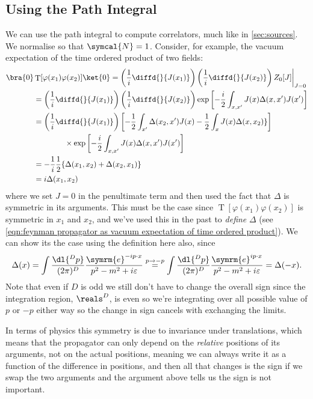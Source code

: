 \documentclass[fleqn]{NotesClass}
\newcommand{\e}{\symrm{e}}
\DeclareMathOperator{\timeOrdering}{T}
\begin{document}
    \subsection{Using the Path Integral}
    We can use the path integral to compute correlators, much like in \cref{sec:sources}.
    We normalise so that \(\symcal{N} = 1\).
    Consider, for example, the vacuum expectation of the time ordered product of two fields:
    \begin{align*}
        \bra{0} &\timeOrdering[\varphi(x_1)\varphi(x_2)] \ket{0} = \left( \frac{1}{i} \diffd{}{J(x_1)} \right) \left( \frac{1}{i} \diffd{}{J(x_2)} \right) Z_0[J] \bigg|_{J = 0}\\
        &= \left( \frac{1}{i} \diffd{}{J(x_1)} \right) \left( \frac{1}{i} \diffd{}{J(x_2)} \right) \exp\left[ -\frac{i}{2} \int_{x,x'} J(x)\Delta(x, x')J(x') \right]\\
        &= \left( \frac{1}{i} \diffd{}{J(x_1)} \right) \left[ -\frac{1}{2}\int_{x'} \Delta(x_2, x')J(x) - \frac{1}{2} \int_x J(x)\Delta(x, x_2)\} \right]\\
        & \qquad \qquad \times \exp\left[ -\frac{i}{2} \int_{x,x'} J(x)\Delta(x, x')J(x') \right]\\
        &= -\frac{1}{i}\frac{1}{2}\{\Delta(x_1, x_2) + \Delta(x_2, x_1)\}\\
        &= i\Delta(x_1, x_2)
    \end{align*}
    where we set \(J = 0\) in the penultimate term and then used the fact that \(\Delta\) is symmetric in its arguments.
    This must be the case since \(\timeOrdering[\varphi(x_1)\varphi(x_2)]\) is symmetric in \(x_1\) and \(x_2\), and we've used this in the past to \emph{define} \(\Delta\) (see \cref{eqn:feynman propagator as vacuum expectation of time ordered product}).
    We can show its the case using the definition here also, since
    \begin{equation}
        \Delta(x) = \int \frac{\dl{^Dp}}{(2\pi)^D} \frac{\e^{-ip\cdot x}}{p^2 - m^2 + i\varepsilon} \stackrel{p \to -p}{=} \int \frac{\dl{^Dp}}{(2\pi)^D} \frac{\e^{ip\cdot x}}{p^2 - m^2 + i\varepsilon} = \Delta(-x).
    \end{equation}
    Note that even if \(D\) is odd we still don't have to change the overall sign since the integration region, \(\reals^D\), is even so we're integrating over all possible value of \(p\) or \(-p\) either way so the change in sign cancels with exchanging the limits.
    
    In terms of physics this symmetry is due to invariance under translations, which means that the propagator can only depend on the \emph{relative} positions of its arguments, not on the actual positions, meaning we can always write it as a function of the difference in positions, and then all that changes is the sign if we swap the two arguments and the argument above tells us the sign is not important.
    
\end{document}

